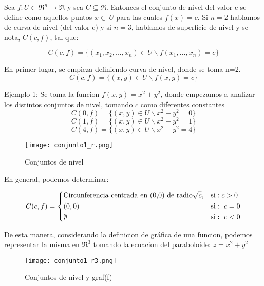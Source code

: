 
\begin{definition}  
\label{def:conjunto de nivel}
 \mbox{}
 
Sea $f: U\subset\Re^n\rightarrow\Re$ y sea $C\subseteq\Re$. Entonces el conjunto de nivel del valor c se define como aquellos puntos $x\in\ U$ para las cuales $f(x)=c$. Si $n=2$ hablamos de curva de nivel (del valor c) y si $n=3$, hablamos de superficie de nivel y se nota, $C(c,f)$, tal que:

 \[
C(c,f)=\{(x_1,x_2,...,x_n) \in U \backslash f (x_1,...,x_n)=c \}
 \]

En primer lugar, se empieza definiendo curva de nivel, donde se toma n=2.
 \[
C(c,f)=\{(x,y) \in U \backslash f (x,y)=c \}
 \]

Ejemplo 1: Se toma la funcion $f(x,y)=x^2+y^2$, donde empezamos a analizar los distintos conjuntos de nivel, tomando $c$ como diferentes constantes
 \[
C(0,f)=\{(x,y) \in U \backslash x^2+y^2=0 \}
\]
 \[
C(1,f)=\{(x,y) \in U \backslash x^2+y^2=1 \}
\]
 \[
C(4,f)=\{(x,y) \in U \backslash x^2+y^2=4 \}
 \]

\begin{figure}[h!] %
    \centering
    \texttt{[image: conjunto1\_r.png]} %
    \caption{Conjuntos de nivel}
    \label{fig:ejemplo} %
\end{figure}

En general, podemos determinar: 

   \[
        C(c,f)=
        \begin{dcases}
           \textnormal{Circunferencia centrada en (0,0) de radio} \sqrt{c},  & \textnormal{si}:  c>0 \\
(0,0)  & \textnormal{si}:\ c=0\\
\emptyset  & \textnormal{si}:\ c<0\\
        \end{dcases}
    \]

De esta manera, considerando la definicion de gráfica de una funcion, podemos representar la misma en $\Re^3$ tomando  la ecuacion del paraboloide: $z=x^2+y^2$

\begin{figure}[h!] %
    \centering
    \texttt{[image: conjunto1\_r3.png]} %
    \caption{Conjuntos de nivel y graf(f)}
    \label{fig:ejemplo} %
\end{figure}




\end{definition}
